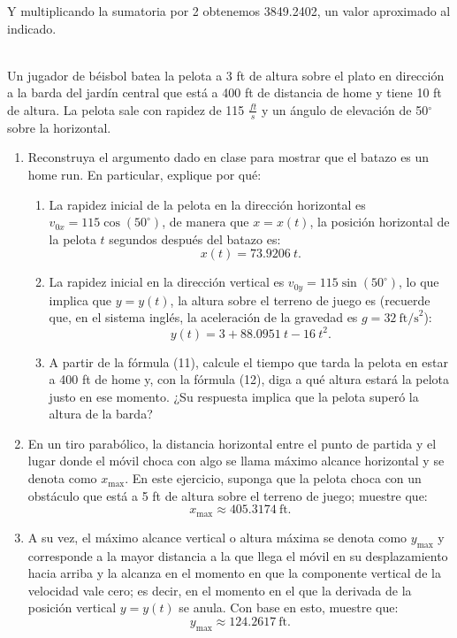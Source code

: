 \documentclass[12pt]{article}
\begin{document}
\begin{enumerate}
Y multiplicando la sumatoria por 2 obtenemos 3849.2402, un valor aproximado al indicado.
    \end{enumerate}
     \\
    Un jugador de béisbol batea la pelota a 3 ft de altura sobre el plato en dirección a la barda del jardín central que está a 400 ft de distancia de home y tiene 10 ft de altura. La pelota sale con rapidez de 115 $\frac{ft}{s}$ y un ángulo de elevación de 50$^{\circ}$ sobre la horizontal.

\begin{enumerate}
    \item Reconstruya el argumento dado en clase para mostrar que el batazo es un home run. En particular, explique por qué:
    \begin{enumerate}
        \item La rapidez inicial de la pelota en la dirección horizontal es \( v_{0x} = 115 \cos (50^\circ) \), de manera que \( x = x(t) \), la posición horizontal de la pelota \( t \) segundos después del batazo es:
        \[
        x(t) = 73.9206 \ t. \tag{11}
        \]
        
        \item La rapidez inicial en la dirección vertical es \( v_{0y} = 115 \sin (50^\circ) \), lo que implica que \( y = y(t) \), la altura sobre el terreno de juego es (recuerde que, en el sistema inglés, la aceleración de la gravedad es \( g = 32 \ \text{ft/s}^2 \)):
        \[
        y(t) = 3 + 88.0951 \ t - 16 \ t^2. \tag{12}
        \]
        
        \item A partir de la fórmula (11), calcule el tiempo que tarda la pelota en estar a 400 ft de home y, con la fórmula (12), diga a qué altura estará la pelota justo en ese momento. ¿Su respuesta implica que la pelota superó la altura de la barda?
    \end{enumerate}
    
    \item En un tiro parabólico, la distancia horizontal entre el punto de partida y el lugar donde el móvil choca con algo se llama máximo alcance horizontal y se denota como \( x_{\text{max}} \). En este ejercicio, suponga que la pelota choca con un obstáculo que está a 5 ft de altura sobre el terreno de juego; muestre que:
    \[
    x_{\text{max}} \approx 405.3174 \ \text{ft}.
    \]
    
    \item A su vez, el máximo alcance vertical o altura máxima se denota como \( y_{\text{max}} \) y corresponde a la mayor distancia a la que llega el móvil en su desplazamiento hacia arriba y la alcanza en el momento en que la componente vertical de la velocidad vale cero; es decir, en el momento en el que la derivada de la posición vertical \( y = y(t) \) se anula. Con base en esto, muestre que:
    \[
    y_{\text{max}} \approx 124.2617 \ \text{ft}.
    \]
    

\end{enumerate}
\end{document}
